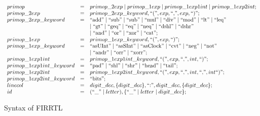 \begin{figure}[t]
{\[\begin{array}{l l l}
%
primop & = & primop\_2exp \mid primop\_1exp \mid primop\_1exp1int \mid primop\_1exp2int; \\
primop\_2exp & = & primop\_2exp\_keyword, \mbox{``(''} , exp, \mbox{``,''} , exp, \mbox{``)''}; \\
%
primop\_2exp\_keyword & = &  \mbox{``add''}  \mid  \mbox{``sub''}  \mid  \mbox{``sub''} \mid \mbox{``mul''} \mid \mbox{``div''} \mid \mbox{``mod''} \mid \mbox{``lt''} \mid \mbox{``leq''}  \\
& &  \mid \mbox{``gt''} \mid \mbox{``geq''} \mid \mbox{``eq''} \mid \mbox{``neq''} \mid \mbox{``dshl''}  \mid \mbox{``dshr''} \\
 & & \mid \mbox{``and''} \mid \mbox{``or''} \mid \mbox{``xor''} \mid \mbox{``cat''}; \\
primop\_1exp & = & primop\_1exp\_keyword, \mbox{``(''}, exp, \mbox{``)''}; \\
primop\_1exp\_keyword & = & \mbox{``asUInt''} \mid \mbox{``asSInt''} \mid \mbox{``asClock''} \mid \mbox{``cvt''} \mid \mbox{``neg''} \mid \mbox{``not''}  \\
& & \mid \mbox{``andr''} \mid \mbox{``orr''} \mid  \mbox{``xorr''};\\
%
primop\_1exp1int & = & primop\_1exp1int\_keyword, \mbox{``(''}, exp, \mbox{``,''}, int, \mbox{``)''}; \\
primop\_1exp1int\_keyword & = & \mbox{``pad''} \mid \mbox{``shl''} \mid \mbox{``shr''} \mid \mbox{``head''} \mid \mbox{``tail''}; \\
primop\_1exp2int & = & primop\_1exp2int\_keyword, \mbox{``(''}, exp, \mbox{``,''}, int, \mbox{``,''}, int \mbox{``)''}; \\
primop\_1exp2int\_keyword & = & \mbox{``bits''}; \\
%
linecol & = &  digit\_dec, \{digit\_dec\}, \mbox{``:''}, digit\_dec, \{digit\_dec\};\\
id & = & ( \mbox{``\_''} \mid letter), \{ \mbox{``\_''} \mid letter \mid digit\_dec\};
%
\end{array}
\]
}
\caption{Syntax of FIRRTL}
\label{fig-firrtl-synt}
\end{figure}



